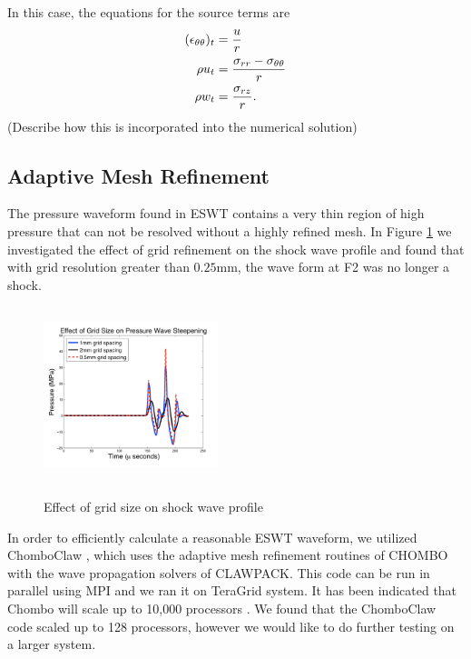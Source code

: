 \documentclass{article}
\begin{document}
In this case, the equations for the source terms are
\begin{align}
(\epsilon_{\theta \theta})_t &= \frac{u}{r}  \notag\\
\rho u_t &= \frac{\sigma_{rr} - \sigma_{\theta \theta}}{r}\label{eqn:axisymeulsource}\\
\rho w_t &= \frac{\sigma_{rz}}{r}.\notag
\end{align} 
(Describe how this is incorporated into the numerical solution)

\subsection{Adaptive Mesh Refinement}
\label{sec:amr}
The pressure waveform found in ESWT contains a very thin region of high pressure that can not be 
resolved without a highly refined mesh.  In Figure \ref{fig:steepening} we investigated the effect of grid 
refinement on the shock wave profile and found that with grid resolution greater than $0.25$mm, the 
wave form at F2 was no longer a shock. 
\begin{figure}[h!]
\begin{center}
\includegraphics[height=2in, width=2in]{grid_refinement_steepening.pdf}
\label{fig:steepening}
\caption{Effect of grid size on shock wave profile}
\end{center}
\end{figure}
In order to efficiently calculate a reasonable ESWT waveform, we utilized ChomboClaw 
\cite{chomboclaw}, which uses the adaptive mesh refinement routines of CHOMBO with the wave 
propagation solvers of CLAWPACK.  This code can be run in parallel using MPI and we ran it on 
TeraGrid \cite{teragrid} system.  It has been indicated that Chombo will scale up to 10,000 processors 
\cite{collela_correspondance}.  We found that the ChomboClaw code scaled up to 128 processors, 
however we would like to do further testing on a larger system.
\end{document}
